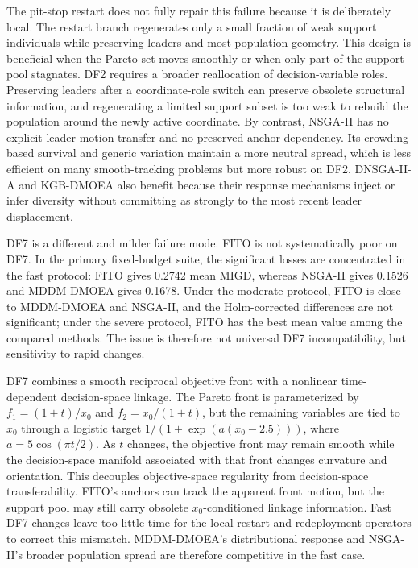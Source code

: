 \documentclass[preprint,12pt]{elsarticle}
\begin{document}
The pit-stop restart does not fully repair this failure because it is deliberately local. The restart branch regenerates only a small fraction of weak support individuals while preserving leaders and most population geometry. This design is beneficial when the Pareto set moves smoothly or when only part of the support pool stagnates. DF2 requires a broader reallocation of decision-variable roles. Preserving leaders after a coordinate-role switch can preserve obsolete structural information, and regenerating a limited support subset is too weak to rebuild the population around the newly active coordinate. By contrast, NSGA-II has no explicit leader-motion transfer and no preserved anchor dependency. Its crowding-based survival and generic variation maintain a more neutral spread, which is less efficient on many smooth-tracking problems but more robust on DF2. DNSGA-II-A and KGB-DMOEA also benefit because their response mechanisms inject or infer diversity without committing as strongly to the most recent leader displacement.

DF7 is a different and milder failure mode. FITO is not systematically poor on DF7. In the primary fixed-budget suite, the significant losses are concentrated in the fast protocol: FITO gives 0.2742 mean MIGD, whereas NSGA-II gives 0.1526 and MDDM-DMOEA gives 0.1678. Under the moderate protocol, FITO is close to MDDM-DMOEA and NSGA-II, and the Holm-corrected differences are not significant; under the severe protocol, FITO has the best mean value among the compared methods. The issue is therefore not universal DF7 incompatibility, but sensitivity to rapid changes.

DF7 combines a smooth reciprocal objective front with a nonlinear time-dependent decision-space linkage. The Pareto front is parameterized by $f_1=(1+t)/x_0$ and $f_2=x_0/(1+t)$, but the remaining variables are tied to $x_0$ through a logistic target $1/(1+\exp(a(x_0-2.5)))$, where $a=5\cos(\pi t/2)$. As $t$ changes, the objective front may remain smooth while the decision-space manifold associated with that front changes curvature and orientation. This decouples objective-space regularity from decision-space transferability. FITO's anchors can track the apparent front motion, but the support pool may still carry obsolete $x_0$-conditioned linkage information. Fast DF7 changes leave too little time for the local restart and redeployment operators to correct this mismatch. MDDM-DMOEA's distributional response and NSGA-II's broader population spread are therefore competitive in the fast case.
\end{document}
